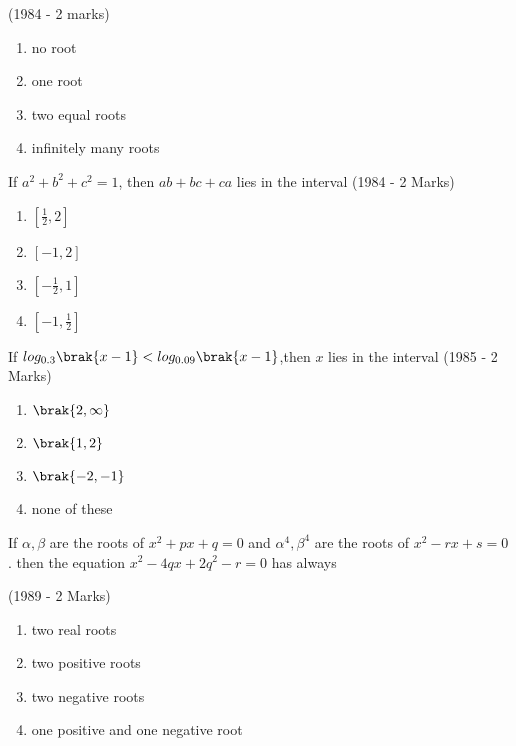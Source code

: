 \hfill (1984 - 2 marks)
\begin{enumerate}
\item no root
\item one root
\item two equal roots
\item infinitely many roots 
\end{enumerate}
\item If $a^2+b^2+c^2=1$, then $ab+bc+ca$ lies in the interval \hfill (1984 - 2 Marks)
\begin{enumerate}
\item $[\frac{1}{2},2]$
\item $[-1,2]$
\item $[-\frac{1}{2},1]$
\item $[-1,\frac{1}{2}]$
\end{enumerate}
\item If $log_{0.3}\brak{x-1}<log_{0.09}\brak{x-1}$,then $x$ lies in the interval 
\hfill (1985 - 2 Marks)
\begin{enumerate}
\item $\brak{2,\infty}$
\item $\brak{1,2}$
\item $\brak{-2,-1}$
\item none of these
\end{enumerate}
\item If $\alpha,\beta$ are the roots of $x^2+px+q=0$ and $\alpha^4,\beta^4$ are the roots of $x^2-rx+s=0$. then the equation $x^2-4qx+2q^2-r=0$ has always
 
\hfill(1989 - 2 Marks)
\begin{enumerate}
\item two real roots
\item two positive roots
\item two negative roots
\item one positive and one negative root

\end{enumerate}


































